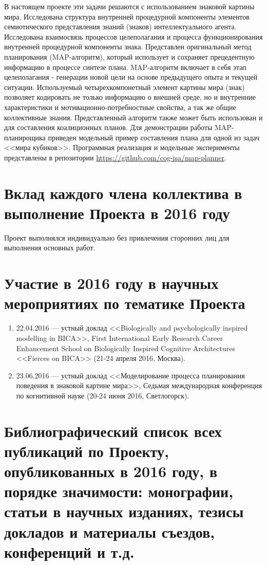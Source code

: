 \documentclass[12pt]{report}
\begin{document}
	В настоящем проекте эти задачи решаются с использованием знаковой картины мира. Исследована структура внутренней процедурной компоненты элементов семиотического представления знаний (знаков) интеллектуального агента. Исследована взаимосвязь процессов целеполагания и процесса функционирования внутренней процедурной компоненты знака. Представлен оригинальный метод планирования (MAP-алгоритм), который использует и сохраняет прецедентную информацию в процессе синтезе плана. MAP-алгоритм включает в себя этап целеполагания - генерации новой цели на основе предыдущего опыта и текущей ситуации. Используемый четырехкомпонетный элемент картины мира (знак) позволяет кодировать не только информацию о внешней среде, но и внутренние характеристики и мотивационно-потребностные свойства, а так же общие коллективные знания. Представленный алгоритм также может быть использован и для составления коалиционных планов. Для демонстрации работы MAP-планирощика приведен модельный пример составления плана для одной из задач <<мира кубиков>>. Программная реализация и модельные эксперименты представлены в репозитории \href{https://github.com/cog-isa/map-planner}{https://github.com/cog-isa/map-planner}.
	
	\printbibliography[heading=none,resetnumbers=true]
	
	\section{Вклад каждого члена коллектива в выполнение Проекта в 2016 году}
	Проект выполнялся индивидуально без привлечения сторонних лиц для выполнения основных работ.
	
	\section{Участие в 2016 году в научных мероприятиях по тематике Проекта}
	\begin{enumerate}
		\item 22.04.2016 --- устный доклад <<Biologically and psychologically inspired modelling in BICA>>, First International Early Research Career Enhancement School on Biologically Inspired Cognitive Architectures <<Fierces on BICA>> (21-24 апреля 2016, Москва).
		\item 23.06.2016 --- устный доклад <<Моделирование процесса планирования поведения в знаковой картине мира>>, Седьмая международная конференция по когнитивной науке (20-24 июня 2016, Светлогорск).
	\end{enumerate}
	\section{Библиографический список всех публикаций по Проекту, опубликованных в 2016 году, в порядке значимости: монографии, статьи в научных изданиях, тезисы докладов и материалы съездов, конференций и т.д.}
	\nocite{*}
	\printbibliography[heading=none,keyword={myart},resetnumbers=true]
	\printbibliography[heading=none,keyword={myconf}]
	\printbibliography[heading=none,keyword={myth}]
\end{document}
